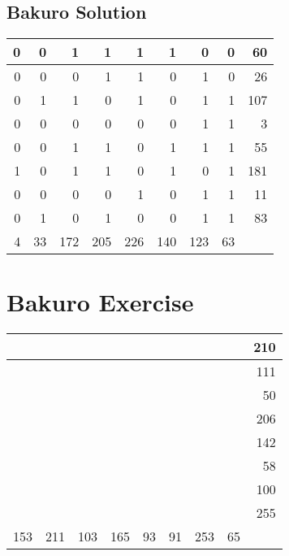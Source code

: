 \documentclass[]{article}
\begin{document}
 \subsection{Bakuro Solution} 
\begin{tabular}{rrrrrrrrr}
\hline
 0 &  0 &   1 &   1 &   1 &   1 &   0 &  0 &  60 \\ \hline
 0 &  0 &   0 &   1 &   1 &   0 &   1 &  0 &  26 \\ \hline
 0 &  1 &   1 &   0 &   1 &   0 &   1 &  1 & 107 \\ \hline
 0 &  0 &   0 &   0 &   0 &   0 &   1 &  1 &   3 \\ \hline
 0 &  0 &   1 &   1 &   0 &   1 &   1 &  1 &  55 \\ \hline
 1 &  0 &   1 &   1 &   0 &   1 &   0 &  1 & 181 \\ \hline
 0 &  0 &   0 &   0 &   1 &   0 &   1 &  1 &  11 \\ \hline
 0 &  1 &   0 &   1 &   0 &   0 &   1 &  1 &  83 \\ \hline
 4 & 33 & 172 & 205 & 226 & 140 & 123 & 63 &     \\ \hline
\hline
\end{tabular}\newpage\section{Bakuro Exercise}\begin{tabular}{rrrrrrrrr}
\hline
     &     &     &     &    &    &     &    & 210 \\ \hline
     &     &     &     &    &    &     &    & 111 \\ \hline
     &     &     &     &    &    &     &    &  50 \\ \hline
     &     &     &     &    &    &     &    & 206 \\ \hline
     &     &     &     &    &    &     &    & 142 \\ \hline
     &     &     &     &    &    &     &    &  58 \\ \hline
     &     &     &     &    &    &     &    & 100 \\ \hline
     &     &     &     &    &    &     &    & 255 \\ \hline
 153 & 211 & 103 & 165 & 93 & 91 & 253 & 65 &     \\ \hline
\hline
\end{tabular}\newpage 
\end{document}
